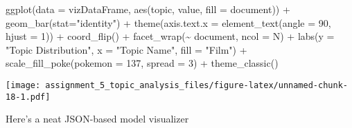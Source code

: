 \documentclass[
]{article}
\newenvironment{Shaded}{\begin{snugshade}}{\end{snugshade}}
\newcommand{\AttributeTok}[1]{\textcolor[rgb]{0.77,0.63,0.00}{#1}}
\newcommand{\CommentTok}[1]{\textcolor[rgb]{0.56,0.35,0.01}{\textit{#1}}}
\newcommand{\ControlFlowTok}[1]{\textcolor[rgb]{0.13,0.29,0.53}{\textbf{#1}}}
\newcommand{\DecValTok}[1]{\textcolor[rgb]{0.00,0.00,0.81}{#1}}
\newcommand{\FunctionTok}[1]{\textcolor[rgb]{0.00,0.00,0.00}{#1}}
\newcommand{\NormalTok}[1]{#1}
\newcommand{\OtherTok}[1]{\textcolor[rgb]{0.56,0.35,0.01}{#1}}
\newcommand{\SpecialCharTok}[1]{\textcolor[rgb]{0.00,0.00,0.00}{#1}}
\newcommand{\StringTok}[1]{\textcolor[rgb]{0.31,0.60,0.02}{#1}}
\begin{document}
\begin{Shaded}
\begin{Highlighting}[]
\FunctionTok{ggplot}\NormalTok{(}\AttributeTok{data =}\NormalTok{ vizDataFrame, }\FunctionTok{aes}\NormalTok{(topic, value, }\AttributeTok{fill =}\NormalTok{ document)) }\SpecialCharTok{+}
  \FunctionTok{geom\_bar}\NormalTok{(}\AttributeTok{stat=}\StringTok{"identity"}\NormalTok{) }\SpecialCharTok{+}
  \FunctionTok{theme}\NormalTok{(}\AttributeTok{axis.text.x =} \FunctionTok{element\_text}\NormalTok{(}\AttributeTok{angle =} \DecValTok{90}\NormalTok{, }\AttributeTok{hjust =} \DecValTok{1}\NormalTok{)) }\SpecialCharTok{+}  
  \FunctionTok{coord\_flip}\NormalTok{() }\SpecialCharTok{+}
  \FunctionTok{facet\_wrap}\NormalTok{(}\SpecialCharTok{\textasciitilde{}}\NormalTok{ document, }\AttributeTok{ncol =}\NormalTok{ N) }\SpecialCharTok{+} 
  \FunctionTok{labs}\NormalTok{(}\AttributeTok{y =} \StringTok{"Topic Distribution"}\NormalTok{, }
       \AttributeTok{x =} \StringTok{"Topic Name"}\NormalTok{,}
       \AttributeTok{fill =} \StringTok{"Film"}\NormalTok{) }\SpecialCharTok{+} 
  \FunctionTok{scale\_fill\_poke}\NormalTok{(}\AttributeTok{pokemon =} \DecValTok{137}\NormalTok{, }\AttributeTok{spread =} \DecValTok{3}\NormalTok{) }\SpecialCharTok{+} 
  \FunctionTok{theme\_classic}\NormalTok{()}
\end{Highlighting}
\end{Shaded}

\texttt{[image: assignment\_5\_topic\_analysis\_files/figure-latex/unnamed-chunk-18-1.pdf]}

Here's a neat JSON-based model visualizer

\begin{Shaded}
\end{Shaded}
\end{document}
